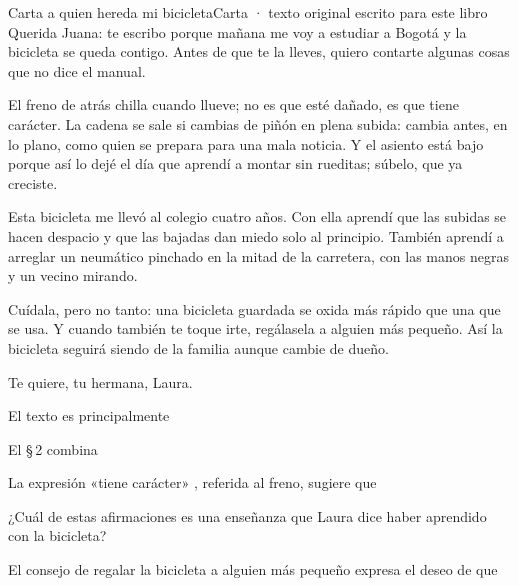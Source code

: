 \bitacora

\evaluacion
\begin{texto}{Carta a quien hereda mi bicicleta}{Carta · texto original escrito para este libro}
\pa Querida Juana: te escribo porque mañana me voy a estudiar a Bogotá y la bicicleta se queda contigo. Antes de que te la
lleves, quiero contarte algunas cosas que no dice el manual.

\pa El freno de atrás chilla cuando llueve; no es que esté dañado, es que tiene carácter. La cadena se sale si cambias de
piñón en plena subida: cambia antes, en lo plano, como quien se prepara para una mala noticia. Y el asiento está bajo
porque así lo dejé el día que aprendí a montar sin rueditas; súbelo, que ya creciste.

\pa Esta bicicleta me llevó al colegio cuatro años. Con ella aprendí que las subidas se hacen despacio y que las bajadas
dan miedo solo al principio. También aprendí a arreglar un neumático pinchado en la mitad de la carretera, con las manos
negras y un vecino mirando.

\pa Cuídala, pero no tanto: una bicicleta guardada se oxida más rápido que una que se usa. Y cuando también te toque
irte, regálasela a alguien más pequeño. Así la bicicleta seguirá siendo de la familia aunque cambie de dueño.

\pa Te quiere, tu hermana, Laura.
\end{texto}
\begin{ejercicios}
\item El texto es principalmente
\item El \S\,2 combina
\item La expresión «tiene carácter» , referida al freno, sugiere que
\item ¿Cuál de estas afirmaciones es una enseñanza que Laura dice haber aprendido con la bicicleta?
\item El consejo de regalar la bicicleta a alguien más pequeño  expresa el deseo de que
\end{ejercicios}
